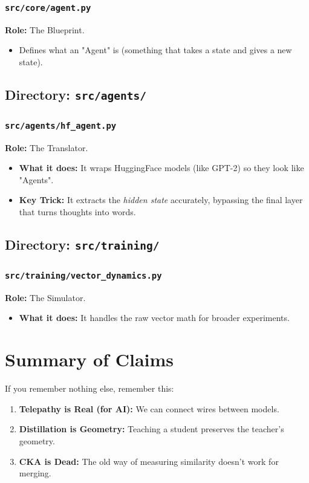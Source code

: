 \documentclass[11pt,a4paper]{article}
\begin{document}
\subsubsection{\texttt{src/core/agent.py}}
\textbf{Role:} The Blueprint.
\begin{itemize}
    \item Defines what an "Agent" is (something that takes a state and gives a new state).
\end{itemize}

\subsection{Directory: \texttt{src/agents/}}
\subsubsection{\texttt{src/agents/hf\_agent.py}}
\textbf{Role:} The Translator.
\begin{itemize}
    \item \textbf{What it does:} It wraps HuggingFace models (like GPT-2) so they look like "Agents".
    \item \textbf{Key Trick:} It extracts the \textit{hidden state} accurately, bypassing the final layer that turns thoughts into words.
\end{itemize}

\subsection{Directory: \texttt{src/training/}}
\subsubsection{\texttt{src/training/vector\_dynamics.py}}
\textbf{Role:} The Simulator.
\begin{itemize}
    \item \textbf{What it does:} It handles the raw vector math for broader experiments.
\end{itemize}

\section{Summary of Claims}
If you remember nothing else, remember this:
\begin{enumerate}
    \item \textbf{Telepathy is Real (for AI):} We can connect wires between models.
    \item \textbf{Distillation is Geometry:} Teaching a student preserves the teacher's geometry.
    \item \textbf{CKA is Dead:} The old way of measuring similarity doesn't work for merging.
\end{enumerate}
\end{document}
